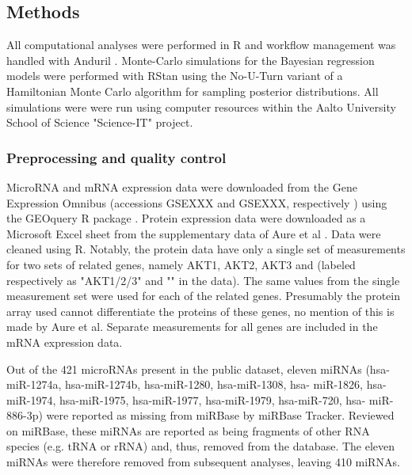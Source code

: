 





\subsection{Methods}

All computational analyses were performed in R and workflow management was
handled with Anduril \citep{Ovaska2010}. Monte-Carlo simulations for the
Bayesian regression models were performed with RStan
\citep{RStan} using the No-U-Turn variant of a Hamiltonian Monte Carlo
algorithm for sampling posterior distributions. All simulations were were run using
computer resources within the Aalto University School of Science "Science-IT"
project.



\subsubsection{Preprocessing and quality control}

MicroRNA and mRNA expression data were downloaded from the Gene Expression
Omnibus (accessions GSEXXX and GSEXXX, respectively \citep{Edgar2002}) using
the GEOquery R package \citep{GEOquery}. Protein expression data were
downloaded as a Microsoft Excel sheet from the supplementary data of Aure et
al \citep{Aure2015}. Data were cleaned using R. Notably, the protein
data have only a single set of measurements for two sets of related genes,
namely AKT1, AKT2, AKT3 and (labeled respectively as "AKT1/2/3" and "" in the data).
The same values from the single measurement set were used for each
of the related genes. Presumably the protein array used cannot differentiate
the proteins of these genes, no mention of this is made by Aure et al.
Separate measurements for all genes are included in the mRNA expression data.

Out of the 421 microRNAs present in the public dataset, eleven miRNAs (hsa-
miR-1274a, hsa-miR-1274b, hsa-miR-1280, hsa-miR-1308, hsa- miR-1826, hsa-
miR-1974, hsa-miR-1975, hsa-miR-1977, hsa-miR-1979, hsa-miR-720, hsa-
miR-886-3p) were reported as missing from miRBase by miRBase Tracker. Reviewed
on miRBase, these miRNAs are reported as being fragments of other RNA species
(e.g. tRNA or rRNA) and, thus, removed from the database. The eleven miRNAs
were therefore removed from subsequent analyses, leaving 410 miRNAs.

